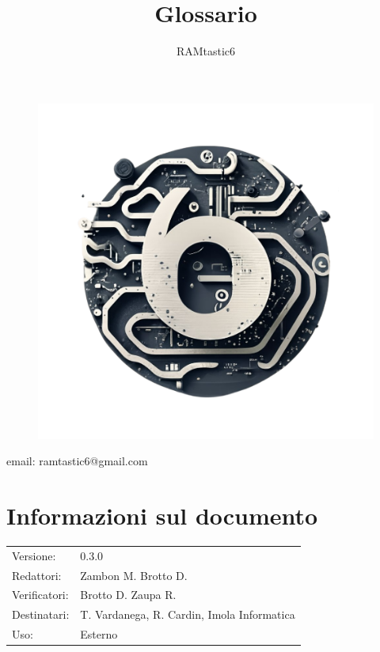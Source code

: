 \documentclass[12pt, oneside]{article}
\author{RAMtastic6}
\begin{document}
\thispagestyle{empty}
\title{Glossario}
\maketitle
\begin{figure}[h]
  \centering
  \includegraphics[scale=0.3]{logo.png}
\end{figure}
\begin{center}
    email: ramtastic6@gmail.com
\end{center}

\section*{Informazioni sul documento}
\begin{tabular}{ll}
Versione: & 0.3.0 \\
Redattori:  & Zambon M. Brotto D.\\
Verificatori: & Brotto D. Zaupa R.\\ 
Destinatari: & T. Vardanega, R. Cardin, Imola Informatica \\
Uso: & Esterno
\end{tabular}
\newpage

\end{document}
